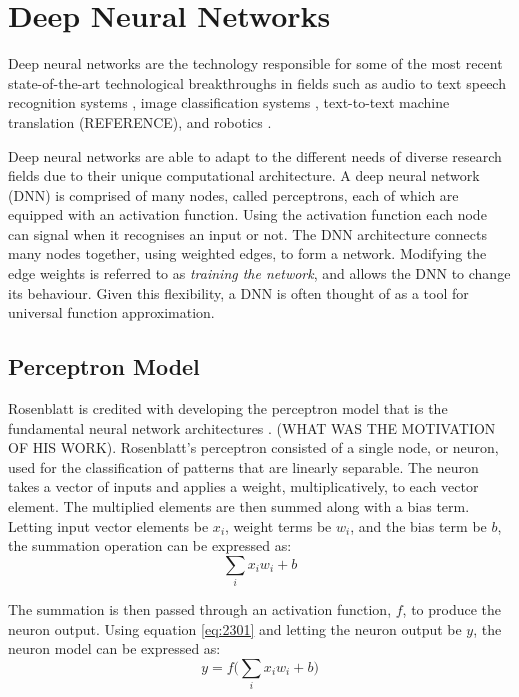 \section{Deep Neural Networks}\label{dnn}
Deep neural networks are the technology responsible for some of the most recent state-of-the-art technological breakthroughs in fields such as audio to text speech recognition systems \cite{Hinton2012}, image classification systems \cite{Krizhevsky2012, Simonyan2014, Szegedy2015, He2016}, text-to-text machine translation (REFERENCE), and robotics \cite{Mnih2015, Lillicrap2015, Schulman2015, Schulman2015highdimensional}.

Deep neural networks are able to adapt to the different needs of diverse research fields due to their unique computational architecture. A deep neural network (DNN) is comprised of many nodes, called perceptrons, each of which are equipped with an activation function. Using the activation function each node can signal when it recognises an input or not. The DNN architecture connects many nodes together, using weighted edges, to form a network. Modifying the edge weights is referred to as \textit{training the network}, and allows the DNN to change its behaviour. Given this flexibility, a DNN is often thought of as a tool for universal function approximation.


\subsection{Perceptron Model}
Rosenblatt is credited with developing the perceptron model that is the fundamental neural network architectures \cite{Rosenblatt1958}. (WHAT WAS THE MOTIVATION OF HIS WORK). Rosenblatt's perceptron consisted of a single node, or neuron, used for the classification of patterns that are linearly separable. The neuron takes a vector of inputs and applies a weight, multiplicatively, to each vector element. The multiplied elements are then summed along with a bias term. Letting input vector elements be $x_i$, weight terms be $w_i$, and the bias term be $b$, the summation operation can be expressed as:
\begin{equation}
	\sum_{i}x_i w_i + b \label{eq:2301}
\end{equation} 

The summation is then passed through an activation function, $f$, to produce the neuron output. Using equation \ref{eq:2301} and letting the neuron output be $y$, the neuron model can be expressed as:
\begin{equation}
	y = f\bigg( \sum_{i}x_i w_i + b \bigg) \label{eq:2302}
\end{equation}

